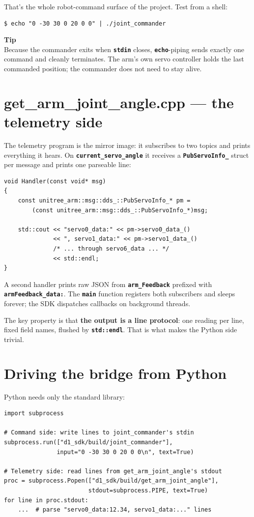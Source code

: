 \documentclass[11pt,twoside,openright]{book}
\newcommand{\code}[1]{\texttt{\bfseries #1}}
\newenvironment{pkttip}{\begin{pktbox}\textbf{Tip}\\[4pt]}{\end{pktbox}}
\begin{document}
That's the whole robot-command surface of the project. Test from a shell:

\begin{lstlisting}
$ echo "0 -30 30 0 20 0 0" | ./joint_commander
\end{lstlisting}

\begin{pkttip}
Because the commander exits when \code{stdin} closes, \code{echo}-piping
sends exactly one command and cleanly terminates. The arm's own servo
controller holds the last commanded position; the commander does not need
to stay alive.
\end{pkttip}

\section{get\_arm\_joint\_angle.cpp --- the telemetry side}

The telemetry program is the mirror image: it subscribes to two topics and
prints everything it hears. On \code{current\_servo\_angle} it receives a
\code{PubServoInfo\_} struct per message and prints one parseable line:

\begin{lstlisting}[style=pktcpp]
void Handler(const void* msg)
{
    const unitree_arm::msg::dds_::PubServoInfo_* pm =
        (const unitree_arm::msg::dds_::PubServoInfo_*)msg;

    std::cout << "servo0_data:" << pm->servo0_data_()
              << ", servo1_data:" << pm->servo1_data_()
              /* ... through servo6_data ... */
              << std::endl;
}
\end{lstlisting}

A second handler prints raw JSON from \code{arm\_Feedback} prefixed with
\code{armFeedback\_data:}. The \code{main} function registers both
subscribers and sleeps forever; the SDK dispatches callbacks on background
threads.

The key property is that \textbf{the output is a line protocol}: one
reading per line, fixed field names, flushed by \code{std::endl}. That is
what makes the Python side trivial.

\section{Driving the bridge from Python}

Python needs only the standard library:

\begin{lstlisting}[style=pktpython]
import subprocess

# Command side: write lines to joint_commander's stdin
subprocess.run(["d1_sdk/build/joint_commander"],
               input="0 -30 30 0 20 0 0\n", text=True)

# Telemetry side: read lines from get_arm_joint_angle's stdout
proc = subprocess.Popen(["d1_sdk/build/get_arm_joint_angle"],
                        stdout=subprocess.PIPE, text=True)
for line in proc.stdout:
    ...  # parse "servo0_data:12.34, servo1_data:..." lines
\end{lstlisting}
\end{document}
